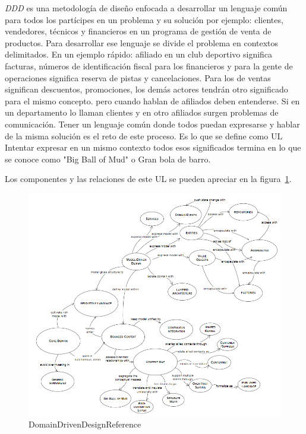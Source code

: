 \textit{DDD} es una metodología de diseño enfocada a desarrollar un lenguaje común para todos los partícipes en un problema y su solución por ejemplo: clientes, vendedores, técnicos y financieros en un programa de gestión de venta de productos.
Para desarrollar ese lenguaje se divide el problema en contextos delimitados.
En un ejemplo rápido: afiliado en un club deportivo significa facturas, números de identificación fiscal para los financieros y para la gente de operaciones significa reserva de pistas y cancelaciones.
Para los de ventas significan descuentos, promociones, los demás actores tendrán otro significado para el mismo concepto.
pero cuando hablan de afiliados deben entenderse.
Si en un departamento lo llaman clientes y en otro afiliados surgen problemas de comunicación.
Tener un lenguaje común donde todos puedan expresarse y hablar de la misma solución es el reto de este proceso.
Es lo que se define como \gls{UL} Intentar expresar en un mismo contexto todos esos significados termina en lo que se conoce como "Big Ball of Mud" o Gran bola de barro.


Los componentes y las relaciones de este UL se pueden apreciar en la figura~\cref{fig:DomainDrivenDesignReference}.

\begin{figure}[H]
    \centering
    \includegraphics[height=0.5\textheight]{./part/Proyecto_ejecutivo/memoria_descriptiva/infoPreviaAntecedentes/img/DomainDrivenDesignReference}
    \caption{DomainDrivenDesignReference\cite{EricEvans2003DDTC}}\label{fig:DomainDrivenDesignReference}
\end{figure}

